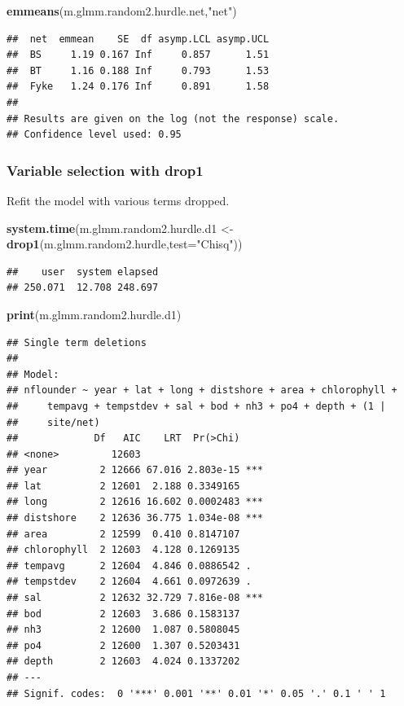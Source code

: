 \documentclass[
]{article}
\newenvironment{Shaded}{\begin{snugshade}}{\end{snugshade}}
\newcommand{\AttributeTok}[1]{\textcolor[rgb]{0.13,0.29,0.53}{#1}}
\newcommand{\FunctionTok}[1]{\textcolor[rgb]{0.13,0.29,0.53}{\textbf{#1}}}
\newcommand{\NormalTok}[1]{#1}
\newcommand{\OtherTok}[1]{\textcolor[rgb]{0.56,0.35,0.01}{#1}}
\newcommand{\StringTok}[1]{\textcolor[rgb]{0.31,0.60,0.02}{#1}}
\begin{document}
\begin{Shaded}
\begin{Highlighting}[]
\FunctionTok{emmeans}\NormalTok{(m.glmm.random2.hurdle.net,}\StringTok{"net"}\NormalTok{)}
\end{Highlighting}
\end{Shaded}

\begin{verbatim}
##  net  emmean    SE  df asymp.LCL asymp.UCL
##  BS     1.19 0.167 Inf     0.857      1.51
##  BT     1.16 0.188 Inf     0.793      1.53
##  Fyke   1.24 0.176 Inf     0.891      1.58
## 
## Results are given on the log (not the response) scale. 
## Confidence level used: 0.95
\end{verbatim}

\subsubsection{Variable selection with
drop1}\label{variable-selection-with-drop1}

Refit the model with various terms dropped.

\begin{Shaded}
\begin{Highlighting}[]
\FunctionTok{system.time}\NormalTok{(m.glmm.random2.hurdle.d1 }\OtherTok{\textless{}{-}} \FunctionTok{drop1}\NormalTok{(m.glmm.random2.hurdle,}\AttributeTok{test=}\StringTok{"Chisq"}\NormalTok{))}
\end{Highlighting}
\end{Shaded}

\begin{verbatim}
##    user  system elapsed 
## 250.071  12.708 248.697
\end{verbatim}

\begin{Shaded}
\begin{Highlighting}[]
\FunctionTok{print}\NormalTok{(m.glmm.random2.hurdle.d1)}
\end{Highlighting}
\end{Shaded}

\begin{verbatim}
## Single term deletions
## 
## Model:
## nflounder ~ year + lat + long + distshore + area + chlorophyll + 
##     tempavg + tempstdev + sal + bod + nh3 + po4 + depth + (1 | 
##     site/net)
##             Df   AIC    LRT  Pr(>Chi)    
## <none>         12603                     
## year         2 12666 67.016 2.803e-15 ***
## lat          2 12601  2.188 0.3349165    
## long         2 12616 16.602 0.0002483 ***
## distshore    2 12636 36.775 1.034e-08 ***
## area         2 12599  0.410 0.8147107    
## chlorophyll  2 12603  4.128 0.1269135    
## tempavg      2 12604  4.846 0.0886542 .  
## tempstdev    2 12604  4.661 0.0972639 .  
## sal          2 12632 32.729 7.816e-08 ***
## bod          2 12603  3.686 0.1583137    
## nh3          2 12600  1.087 0.5808045    
## po4          2 12600  1.307 0.5203431    
## depth        2 12603  4.024 0.1337202    
## ---
## Signif. codes:  0 '***' 0.001 '**' 0.01 '*' 0.05 '.' 0.1 ' ' 1
\end{verbatim}
\end{document}
